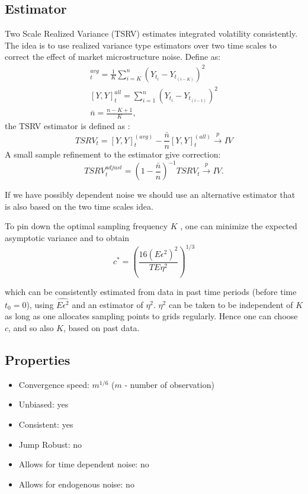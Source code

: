 \documentclass[letterpaper]{report}
\begin{document}
\subsection{Estimator}
Two Scale Realized Variance (TSRV) estimates
integrated volatility consistently. The idea is to use realized variance
type estimators over two time scales to correct the effect of market
microstructure noise. Define as:
\begin{gather}
[Y,Y]^{avg}_t = \frac{1}{K}\sum_{i=K}^n(Y_{t_i} - Y_{t_{(i-K)}})^2\\
[Y,Y]^{all}_t = \sum_{i=1}^n(Y_{t_i} - Y_{t_{(i-1)}})^2\\
\bar{n}=\frac{n-K+1}{K},
\end{gather}
the TSRV estimator is defined as \cite[Zu and Boswijk, 2008]{Zu_Boswijk}:
\begin{equation}
\label{TSRV}
TSRV_t=[Y,Y]^{(avg)}_t - \frac{\bar{n}}{n}[Y,Y]^{(all)}_t \stackrel{p}{\to} IV
\end{equation}
A small sample refinement to the estimator give correction:
\begin{equation}
TSRV_t^{adjust}=\left( 1-\frac{\bar{n}}{n}\right)^{-1} TSRV_t \stackrel{p}{\to} IV.
\end{equation}

\noindent If we have possibly dependent noise we should use an alternative estimator that
is also based on the two time scales idea.

\noindent To pin down the optimal sampling frequency $K$ \cite[Zhang, Mykland, and Ait-Sahalia, 2005]{Zhang_Mykland_Ait-Sahalia}, one can minimize the expected asymptotic variance and to obtain
\begin{equation}
c^* = \left(\frac{16(E\epsilon^2)^2}{TE\eta^2}\right)^{1/3}
\end{equation}

\noindent which can be consistently estimated from data in past time periods
(before time $t_0 = 0$), using $\hat{E\epsilon^2}$ and an estimator of $\eta^2$. $\eta^2$ can be taken to be independent
of $K$ as long as one allocates sampling points to grids regularly. Hence one can choose $c$,
and so also $K$, based on past data.
\subsection{Properties}
\begin{itemize}
\item Convergence speed: $m^{1/6}$ ($m$ - number of observation)
\item Unbiased: yes
\item Consistent: yes
\item Jump Robust: no
\item Allows for time dependent noise: no
\item Allows for endogenous noise: no
\end{itemize}
\end{document}
